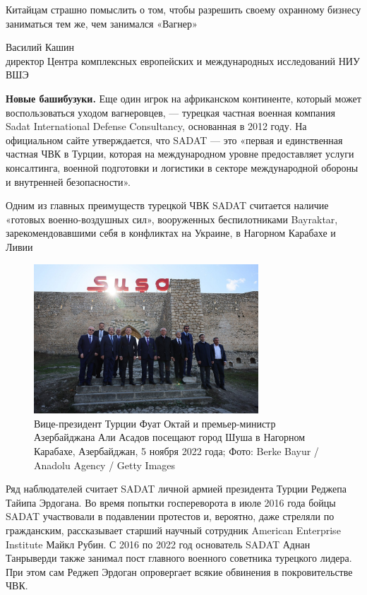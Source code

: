 \begin{fancyquotes}
    Китайцам страшно помыслить о том, чтобы разрешить своему охранному бизнесу заниматься тем же, чем занимался «Вагнер»

    \begin{flushright}
        Василий Кашин\\
        директор Центра комплексных европейских и международных исследований НИУ ВШЭ
    \end{flushright}
\end{fancyquotes}

\textbf{Новые башибузуки.} Еще один игрок на африканском континенте, который может воспользоваться уходом вагнеровцев, — турецкая частная военная компания Sadat International Defense Consultancy, основанная в 2012 году. На официальном сайте утверждается, что SADAT — это «первая и единственная частная ЧВК в Турции, которая на международном уровне предоставляет услуги консалтинга, военной подготовки и логистики в секторе международной обороны и внутренней безопасности».

\begin{center}
    \Large
    Одним из главных преимуществ турецкой ЧВК SADAT считается наличие «готовых военно-воздушных сил», вооруженных беспилотниками Bayraktar, зарекомендовавшими себя в конфликтах на Украине, в Нагорном Карабахе и Ливии
\end{center}

\begin{figure}[h]
    \centering
    \includegraphics[width=0.75\textwidth]{img/pmc_africa_7.jpg}
    \caption{Вице-президент Турции Фуат Октай и премьер-министр Азербайджана Али Асадов посещают город Шуша в Нагорном Карабахе, Азербайджан, 5 ноября 2022 года; Фото: Berke Bayur / Anadolu Agency / Getty Images}
\end{figure}


Ряд наблюдателей считает SADAT личной армией президента Турции Реджепа Тайипа Эрдогана. Во время попытки госпереворота в июле 2016 года бойцы SADAT участвовали в подавлении протестов и, вероятно, даже стреляли по гражданским, рассказывает старший научный сотрудник American Enterprise Institute Майкл Рубин. С 2016 по 2022 год основатель SADAT Аднан Танрыверди также занимал пост главного военного советника турецкого лидера. При этом сам Реджеп Эрдоган опровергает всякие обвинения в покровительстве ЧВК.

